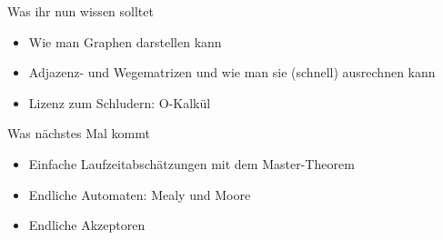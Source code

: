 






\begin{frame}	
	\begin{block}{Was ihr nun wissen solltet}
		\begin{itemize}
			\item Wie man Graphen darstellen kann
			\item Adjazenz- und Wegematrizen und wie man sie (schnell) ausrechnen kann
			\item Lizenz zum Schludern: O-Kalkül
		\end{itemize}
	\end{block}
	
	\begin{block}{Was nächstes Mal kommt}
		\begin{itemize}
			\item Einfache Laufzeitabschätzungen mit dem Master-Theorem
			\item Endliche Automaten: Mealy und Moore
			\item Endliche Akzeptoren
		\end{itemize}
	\end{block}
\end{frame}

\slideThanks

